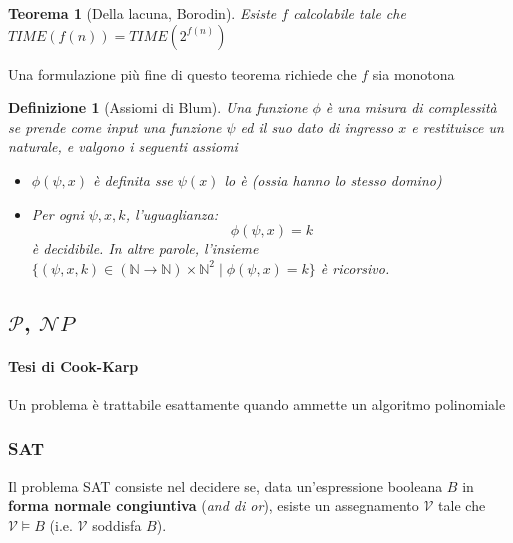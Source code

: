 \documentclass[a4paper,10pt,oneside]{article}
\theoremstyle{break}
\newtheorem{deff}{Definizione}[section]
\newtheorem{teo}{Teorema}[subsection]
\newcommand{\naturals}{\mathbb {N}}
\begin{document}
\newpage

\begin{mdframed}
\begin{teo}[Della lacuna, Borodin]
 Esiste $f$ calcolabile tale che $TIME(f(n)) = TIME(2^{f(n)})$
\end{teo}

\dotfill

Una formulazione più fine di questo teorema richiede che $f$ sia monotona

\end{mdframed}

\begin{mdframed}
\begin{deff}[Assiomi di Blum]
Una funzione $\phi$ è una misura di complessità se prende come input una funzione $\psi$ ed il suo dato di ingresso $x$ e restituisce un naturale, e valgono i seguenti assiomi

\begin{itemize}
 \item [A1.] $\phi(\psi, x)$ è definita sse $\psi(x)$ lo è (ossia hanno lo stesso domino)
 \item [A2.] Per ogni $\psi, x, k$, l'uguaglianza: 
 \[ \phi(\psi, x) = k\]
 è decidibile. In altre parole, l'insieme $\{ (\psi, x, k) \in (\naturals \to \naturals) \times \naturals^2 \mid \phi(\psi, x) = k\}$ è ricorsivo.
\end{itemize}

 
\end{deff}
\end{mdframed}

\hspace{5cm}

\subsection{$\mathcal P$, $\mathcal NP$}
\begin{mdframed}
\paragraph{Tesi di Cook-Karp} Un problema è trattabile esattamente quando ammette un algoritmo polinomiale
\end{mdframed}

\subsubsection{SAT}

Il problema SAT consiste nel decidere se, data un'espressione booleana $B$ in \textbf{forma normale congiuntiva} (\emph{and di or}), esiste un assegnamento $\mathcal V$ tale che $\mathcal V \models B$ (i.e. $\mathcal V$ soddisfa $B$).\smallskip
\end{document}

